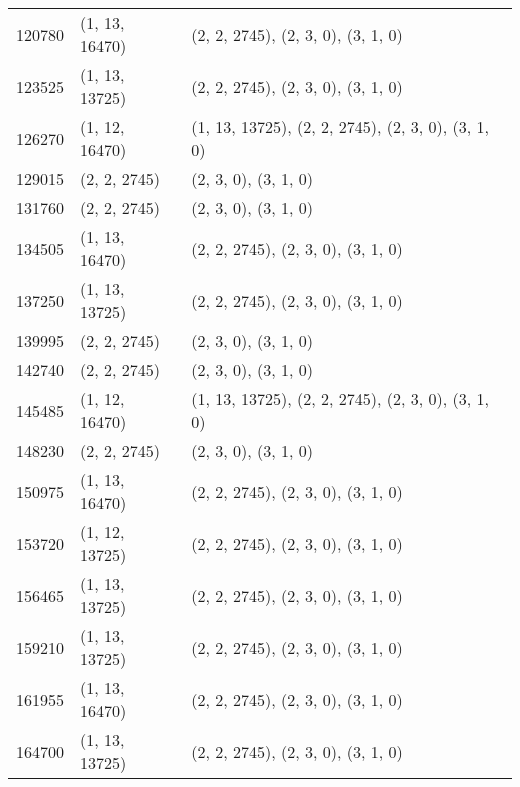 \begin{longtable}{@{\extracolsep{\fill}}lll}
  120780             & (1, 13, 16470)              & (2, 2, 2745), (2, 3, 0), (3, 1, 0)                  \\
  123525             & (1, 13, 13725)              & (2, 2, 2745), (2, 3, 0), (3, 1, 0)                  \\
  126270             & (1, 12, 16470)              & (1, 13, 13725), (2, 2, 2745), (2, 3, 0), (3, 1, 0)  \\
  129015             & (2, 2, 2745)                & (2, 3, 0), (3, 1, 0)                                \\
  131760             & (2, 2, 2745)                & (2, 3, 0), (3, 1, 0)                                \\
  134505             & (1, 13, 16470)              & (2, 2, 2745), (2, 3, 0), (3, 1, 0)                  \\
  137250             & (1, 13, 13725)              & (2, 2, 2745), (2, 3, 0), (3, 1, 0)                  \\
  139995             & (2, 2, 2745)                & (2, 3, 0), (3, 1, 0)                                \\
  142740             & (2, 2, 2745)                & (2, 3, 0), (3, 1, 0)                                \\
  145485             & (1, 12, 16470)              & (1, 13, 13725), (2, 2, 2745), (2, 3, 0), (3, 1, 0)  \\
  148230             & (2, 2, 2745)                & (2, 3, 0), (3, 1, 0)                                \\
  150975             & (1, 13, 16470)              & (2, 2, 2745), (2, 3, 0), (3, 1, 0)                  \\
  153720             & (1, 12, 13725)              & (2, 2, 2745), (2, 3, 0), (3, 1, 0)                  \\
  156465             & (1, 13, 13725)              & (2, 2, 2745), (2, 3, 0), (3, 1, 0)                  \\
  159210             & (1, 13, 13725)              & (2, 2, 2745), (2, 3, 0), (3, 1, 0)                  \\
  161955             & (1, 13, 16470)              & (2, 2, 2745), (2, 3, 0), (3, 1, 0)                  \\
  164700             & (1, 13, 13725)              & (2, 2, 2745), (2, 3, 0), (3, 1, 0)                  \\
\end{longtable}


